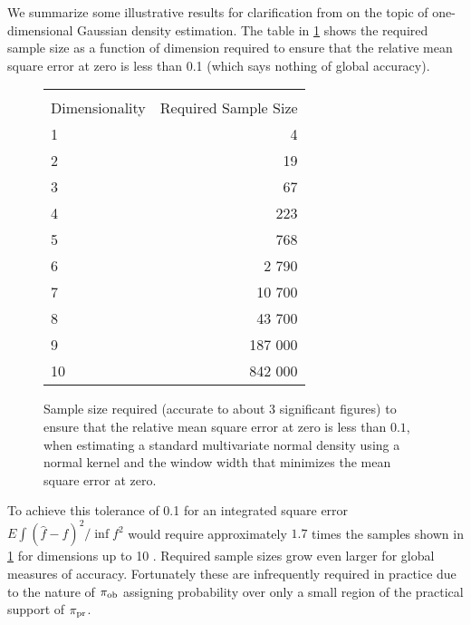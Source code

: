 We summarize some illustrative results for clarification from \cite{Silverman} on the topic of one-dimensional Gaussian density estimation.
The table in \ref{table:silverman} shows the required sample size as a function of dimension required to ensure that the relative mean square error at zero is less than 0.1 (which says nothing of global accuracy).

\begin{figure}
  \begin{tabular}{ l | r }
  \hline \\ Dimensionality & Required Sample Size\\ \hline
  1  & 4\\
  2  & 19\\
  3  & 67\\
  4  & 223\\
  5  & 768\\
  6  & 2 790\\
  7  & 10 700\\
  8  & 43 700\\
  9  & 187 000\\
  10 & 842 000\\ \hline
  \end{tabular}
\caption{Sample size required (accurate to about 3 significant figures) to ensure that the relative mean square error at zero is less than $0.1$, when estimating a standard multivariate normal density using a normal kernel and the window width that minimizes the mean square error at zero.}
\label{table:silverman}
\end{figure}

To achieve this tolerance of 0.1 for an integrated square error $E \int (\hat{f} - f)^2 / \inf f^2$ would require approximately $1.7$ times the samples shown in \ref{table:silverman} for dimensions up to 10 \cite{Silverman}.
Required sample sizes grow even larger for global measures of accuracy.
Fortunately these are infrequently required in practice due to the nature of $\operatorname*{\pi_{ob}}$ assigning probability over only a small region of the practical support of $\operatorname*{\pi_{pr}}$.
